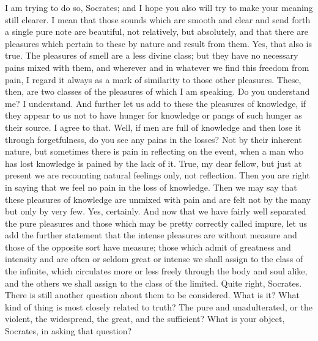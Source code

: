 \documentclass[letterpaper,12pt]{article}
\newcommand{\stephpag}[1]{\marginnote{\small\itshape\fontfamily{ppl}\selectfont #1}}
\begin{document}
\begin{drama}
\protarchusspeaks
I am trying to do so, Socrates; and I hope you also will try to make your meaning still clearer.
\socratesspeaks
I mean that those sounds which are smooth and clear and send forth a single pure note are beautiful, not relatively, but absolutely, and that there are pleasures which pertain to these by nature and result from them.
\protarchusspeaks
Yes, that also is true. \stephpag{e}
\socratesspeaks
The pleasures of smell are a less divine class; but they have no necessary pains mixed with them, and wherever and in whatever we find this freedom from pain, I regard it always as a mark of similarity to those other pleasures. These, then, are two classes of the pleasures of which I am speaking. Do you understand me?
\protarchusspeaks
I understand. \stephpag{52 a}
\socratesspeaks
And further let us add to these the pleasures of knowledge, if they appear to us not to have hunger for knowledge or pangs of such hunger as their source.
\protarchusspeaks
I agree to that.
\socratesspeaks
Well, if men are full of knowledge and then lose it through forgetfulness, do you see any pains in the losses?
\protarchusspeaks
Not by their inherent nature, but sometimes there is pain in reflecting on the event, \stephpag{b} when a man who has lost knowledge is pained by the lack of it.
\socratesspeaks
True, my dear fellow, but just at present we are recounting natural feelings only, not reflection.
\protarchusspeaks
Then you are right in saying that we feel no pain in the loss of knowledge.
\socratesspeaks
Then we may say that these pleasures of knowledge are unmixed with pain and are felt not by the many but only by very few.
\protarchusspeaks
Yes, certainly. \stephpag{c}
\socratesspeaks
And now that we have fairly well separated the pure pleasures and those which may be pretty correctly called impure, let us add the further statement that the intense pleasures are without measure and those of the opposite sort have measure; those which admit of greatness and intensity and are often or seldom great or intense we shall assign to the class of the infinite, which circulates more or less freely through the body and soul alike, \stephpag{d} and the others we shall assign to the class of the limited.
\protarchusspeaks
Quite right, Socrates.
\socratesspeaks
There is still another question about them to be considered.
\protarchusspeaks
What is it?
\socratesspeaks
What kind of thing is most closely related to truth? The pure and unadulterated, or the violent, the widespread, the great, and the sufficient?
\protarchusspeaks
What is your object, Socrates, in asking that question?

\end{drama}
\end{document}
